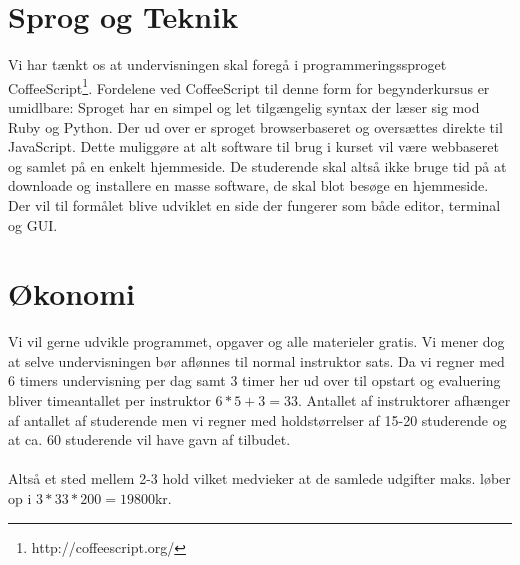 \documentclass[11pt,a4paper]{article}
\begin{document}
\section{Sprog og Teknik}
Vi har tænkt os at undervisningen skal foregå i programmeringssproget 
CoffeeScript\footnote{http://coffeescript.org/}. Fordelene ved CoffeeScript
til denne form for begynderkursus er umidlbare: Sproget har en simpel og let 
tilgængelig syntax der læser sig mod Ruby og Python. Der ud over er sproget
browserbaseret og oversættes direkte til JavaScript. Dette muliggøre at alt 
software til brug i kurset vil være webbaseret og samlet på en enkelt hjemmeside.
De studerende skal altså ikke bruge tid på at downloade og installere en masse
software, de skal blot besøge en hjemmeside. Der vil til formålet blive udviklet
en side der fungerer som både editor, terminal og GUI.

\section{Økonomi}
Vi vil gerne udvikle programmet, opgaver og alle materieler gratis. Vi mener dog 
at selve undervisningen bør aflønnes til normal instruktor sats. Da vi regner 
med 6 timers undervisning per dag samt 3 timer her ud over til opstart og 
evaluering bliver timeantallet per instruktor $6*5 + 3 = 33$. Antallet af 
instruktorer afhænger af antallet af studerende men vi regner med holdstørrelser
af 15-20 studerende og at ca. 60 studerende vil have gavn af tilbudet.
\\\\
Altså et sted mellem 2-3 hold vilket medvieker at de samlede udgifter maks. 
løber op i $3 * 33 * 200 = 19800$kr.
\end{document}
